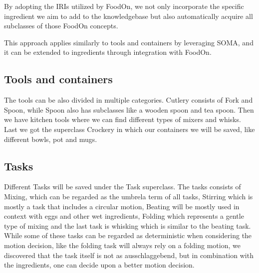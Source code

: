 By adopting the IRIs utilized by FoodOn, we not only incorporate the specific ingredient we aim to add to the knowledgebase but also automatically acquire all subclasses of those FoodOn concepts. 

This approach applies similarly to tools and containers by leveraging SOMA, and it can be extended to ingredients through integration with FoodOn.


\subsection*{Tools and containers}
The tools can be also divided in multiple categories. Cutlery consists of Fork and Spoon, while Spoon also has subclasses like a wooden spoon and tea spoon.
Then we have kitchen tools where we can find different types of mixers and whisks. Last we got the superclass Crockery in which our containers we will be saved, like different bowls, pot and mugs.

\subsection*{Tasks}
Different Tasks will be saved under the Task superclass. The tasks consists of Mixing, which can be regarded as the umbrela term of all tasks, Stirring which is mostly a task that includes a circular motion, Beating will be mostly used in context with eggs and other wet ingredients, Folding which represents a gentle type of mixing and the last task is whisking which is similar to the beating task.
While some of these tasks can be regarded as deterministic when considering the motion decision, like the folding task will always rely on a folding motion, we discovered that the task itself is not as ausschlaggebend, but in combination with the ingredients, one can decide upon a better motion decision. 

